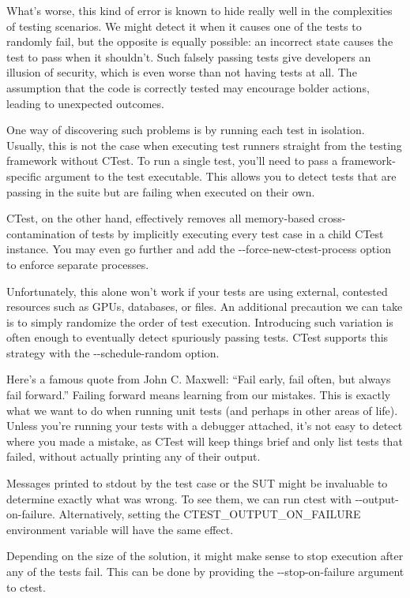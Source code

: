 What’s worse, this kind of error is known to hide really well in the complexities of testing scenarios. We might detect it when it causes one of the tests to randomly fail, but the opposite is equally possible: an incorrect state causes the test to pass when it shouldn’t. Such falsely passing tests give developers an illusion of security, which is even worse than not having tests at all. The assumption that the code is correctly tested may encourage bolder actions, leading to unexpected outcomes.

One way of discovering such problems is by running each test in isolation. Usually, this is not the case when executing test runners straight from the testing framework without CTest. To run a single test, you’ll need to pass a framework-specific argument to the test executable. This allows you to detect tests that are passing in the suite but are failing when executed on their own.

CTest, on the other hand, effectively removes all memory-based cross-contamination of tests by implicitly executing every test case in a child CTest instance. You may even go further and add the -{}-force-new-ctest-process option to enforce separate processes.

Unfortunately, this alone won’t work if your tests are using external, contested resources such as GPUs, databases, or files. An additional precaution we can take is to simply randomize the order of test execution. Introducing such variation is often enough to eventually detect spuriously passing tests. CTest supports this strategy with the -{}-schedule-random option.


Here’s a famous quote from John C. Maxwell: “Fail early, fail often, but always fail forward.” Failing forward means learning from our mistakes. This is exactly what we want to do when running unit tests (and perhaps in other areas of life). Unless you’re running your tests with a debugger attached, it’s not easy to detect where you made a mistake, as CTest will keep things brief and only list tests that failed, without actually printing any of their output.

Messages printed to stdout by the test case or the SUT might be invaluable to determine exactly what was wrong. To see them, we can run ctest with -{}-output-on-failure. Alternatively, setting the CTEST\_OUTPUT\_ON\_FAILURE environment variable will have the same effect.

Depending on the size of the solution, it might make sense to stop execution after any of the tests fail. This can be done by providing the -{}-stop-on-failure argument to ctest.

